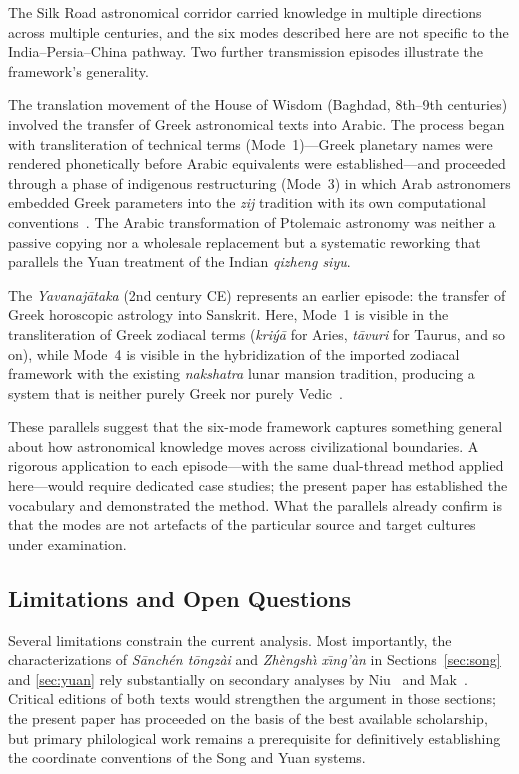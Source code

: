 \documentclass[10pt,a4paper]{article}
\begin{document}
The Silk Road astronomical corridor carried knowledge in multiple directions
across multiple centuries, and the six modes described here are not specific to
the India--Persia--China pathway.  Two further transmission episodes illustrate
the framework's generality.

The translation movement of the House of Wisdom (Baghdad, 8th--9th centuries)
involved the transfer of Greek astronomical texts into Arabic.  The process
began with transliteration of technical terms (Mode~1)---Greek planetary names
were rendered phonetically before Arabic equivalents were established---and
proceeded through a phase of indigenous restructuring (Mode~3) in which Arab
astronomers embedded Greek parameters into the \textit{zij} tradition with its
own computational conventions~\cite{pingree1981jyotih}.  The Arabic
transformation of Ptolemaic astronomy was neither a passive copying nor a
wholesale replacement but a systematic reworking that parallels the Yuan
treatment of the Indian \textit{qizheng siyu}.

The \textit{Yavanaj\={a}taka} (2nd century CE) represents an earlier episode:
the transfer of Greek horoscopic astrology into Sanskrit.  Here, Mode~1 is
visible in the transliteration of Greek zodiacal terms (\textit{kri\'{y}\={a}}
for Aries, \textit{t\={a}vuri} for Taurus, and so on), while Mode~4 is visible
in the hybridization of the imported zodiacal framework with the existing
\textit{nakshatra} lunar mansion tradition, producing a system that is neither
purely Greek nor purely Vedic~\cite{pingree1981jyotih}.

These parallels suggest that the six-mode framework captures something general
about how astronomical knowledge moves across civilizational boundaries.  A
rigorous application to each episode---with the same dual-thread method applied
here---would require dedicated case studies; the present paper has established
the vocabulary and demonstrated the method.  What the parallels already confirm
is that the modes are not artefacts of the particular source and target cultures
under examination.

\subsection*{Limitations and Open Questions}

Several limitations constrain the current analysis.  Most importantly, the
characterizations of \textit{S\={a}nch\'{e}n t\={o}ngz\`{a}i} and \textit{Zh\`{e}ngsh\`{\i} x\={\i}ng'\`{a}n} in Sections~\ref{sec:song}
and \ref{sec:yuan} rely substantially on secondary analyses by
Niu~\cite{niu1995ketu,niu2010fourremains} and Mak~\cite{mak2014pseudoplanets}.
Critical editions of both texts would strengthen the argument in those
sections; the present paper has proceeded on the basis of the best available
scholarship, but primary philological work remains a prerequisite for
definitively establishing the coordinate conventions of the Song and Yuan
systems.
\end{document}
